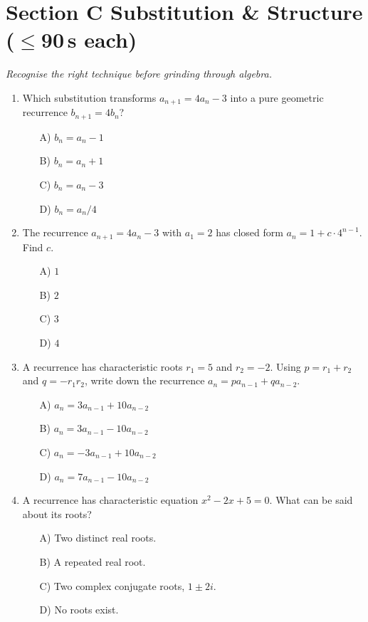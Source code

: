 \documentclass[11pt,a4paper]{article}
\begin{document}
\section*{Section C \quad Substitution \& Structure \hfill{\normalfont\small($\leq$90\,s each)}}

\noindent\textit{Recognise the right technique before grinding through algebra.}

\begin{enumerate}

\item Which substitution transforms $a_{n+1}=4a_n-3$ into a pure geometric recurrence $b_{n+1}=4b_n$?
\begin{itemize}
\item[A)] $b_n=a_n-1$
\item[B)] $b_n=a_n+1$
\item[C)] $b_n=a_n-3$
\item[D)] $b_n=a_n/4$
\end{itemize}

\item The recurrence $a_{n+1}=4a_n-3$ with $a_1=2$ has closed form $a_n=1+c\cdot4^{n-1}$. Find $c$.
\begin{itemize}
\item[A)] $1$
\item[B)] $2$
\item[C)] $3$
\item[D)] $4$
\end{itemize}

\item A recurrence has characteristic roots $r_1=5$ and $r_2=-2$. Using $p=r_1+r_2$ and $q=-r_1r_2$, write down the recurrence $a_n=pa_{n-1}+qa_{n-2}$.
\begin{itemize}
\item[A)] $a_n=3a_{n-1}+10a_{n-2}$
\item[B)] $a_n=3a_{n-1}-10a_{n-2}$
\item[C)] $a_n=-3a_{n-1}+10a_{n-2}$
\item[D)] $a_n=7a_{n-1}-10a_{n-2}$
\end{itemize}

\item A recurrence has characteristic equation $x^2-2x+5=0$. What can be said about its roots?
\begin{itemize}
\item[A)] Two distinct real roots.
\item[B)] A repeated real root.
\item[C)] Two complex conjugate roots, $1\pm2i$.
\item[D)] No roots exist.
\end{itemize}


\end{enumerate}
\end{document}
